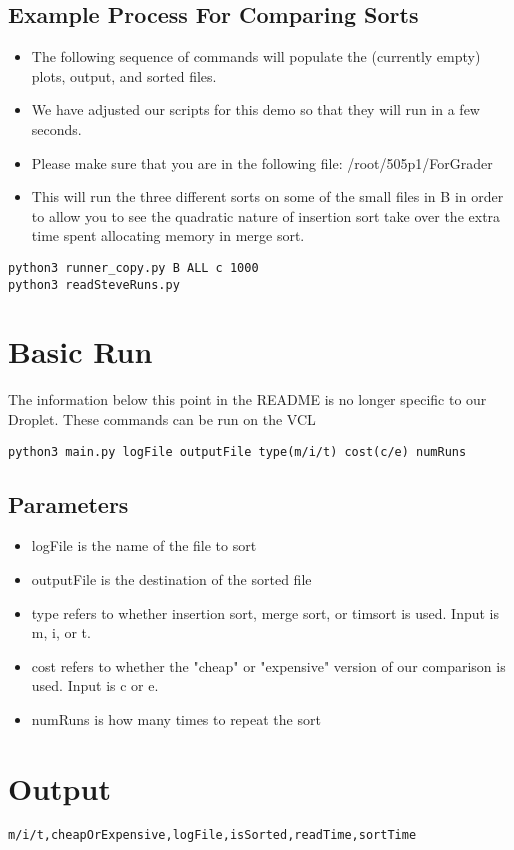 \documentclass[11pt]{article}
\begin{document}
\subsection{Example Process For Comparing Sorts}
\label{sec:org180a0d9}
\begin{itemize}
\item The following sequence of commands will populate the (currently empty) plots, output, and sorted files.
\item We have adjusted our scripts for this demo so that they will run in a few seconds.
\item Please make sure that you are in the following file: /root/505p1/ForGrader
\item This will run the three different sorts on some of the small files in B in order to allow you to see the quadratic nature of insertion sort take over the extra time spent allocating memory in merge sort.
\end{itemize}
\lstset{language=shell,label= ,caption= ,captionpos=b,numbers=none}
\begin{lstlisting}
python3 runner_copy.py B ALL c 1000
python3 readSteveRuns.py
\end{lstlisting}
\section{Basic Run}
\label{sec:orgcf906a6}
The information below this point in the README is no longer specific to our Droplet. These commands can be run on the VCL
\lstset{language=shell,label= ,caption= ,captionpos=b,numbers=none}
\begin{lstlisting}
python3 main.py logFile outputFile type(m/i/t) cost(c/e) numRuns
\end{lstlisting}
\subsection{Parameters}
\label{sec:orgf2fea30}
\begin{itemize}
\item logFile is the name of the file to sort
\item outputFile is the destination of the sorted file
\item type refers to whether insertion sort, merge sort, or timsort is used. Input is m, i, or t.
\item cost refers to whether the "cheap" or "expensive" version of our comparison is used. Input is c or e.
\item numRuns is how many times to repeat the sort
\end{itemize}
\section{Output}
\label{sec:orgd07411f}
\lstset{language=shell,label= ,caption= ,captionpos=b,numbers=none}
\begin{lstlisting}
m/i/t,cheapOrExpensive,logFile,isSorted,readTime,sortTime
\end{lstlisting}
\end{document}
